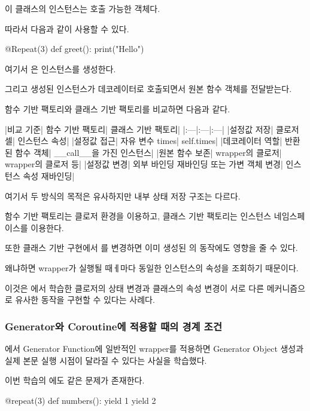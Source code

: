 이 클래스의 인스턴스는 호출 가능한 객체다.

따라서 다음과 같이 사용할 수 있다.

\begin{dhkcode}
@Repeat(3)
def greet():
    print("Hello")
\end{dhkcode}

여기서 은  인스턴스를 생성한다.

그리고 생성된 인스턴스가 데코레이터로 호출되면서 원본 함수 객체를 전달받는다.

함수 기반 팩토리와 클래스 기반 팩토리를 비교하면 다음과 같다.

\begin{dhktable}
|비교 기준|	함수 기반 팩토리|	클래스 기반 팩토리|
|:---|:---|:---|
|설정값 저장|	클로저 셀|	인스턴스 속성|
|설정값 접근|	자유 변수 times|	self.times|
|데코레이터 역할|	반환된 함수 객체|	__call__을 가진 인스턴스|
|원본 함수 보존|	wrapper의 클로저|	wrapper의 클로저 등|
|설정값 변경|	외부 바인딩 재바인딩 또는 가변 객체 변경|	인스턴스 속성 재바인딩|
\end{dhktable}

여기서 두 방식의 목적은 유사하지만 내부 상태 저장 구조는 다르다.

함수 기반 팩토리는 클로저 환경을 이용하고, 클래스 기반 팩토리는 인스턴스 네임스페이스를 이용한다.

또한 클래스 기반 구현에서 를 변경하면 이미 생성된 의 동작에도 영향을 줄 수 있다.

왜냐하면 wrapper가 실행될 때ㅔ마다 동일한 인스턴스의  속성을 조회하기 때문이다.

이것은 에서 학습한 클로저의 상태 변경과 클래스의 속성 변경이 서로 다른 메커니즘으로 유사한 동작을 구현할 수 있다는 사례다.

\subsubsection{Generator와 Coroutine에 적용할 때의 경계 조건}

에서 Generator Function에 일반적인 wrapper를 적용하면 Generator Object 생성과 실제 본문 실행 시점이 달라질 수 있다는 사실을 학습했다.

이번 학습의 에도 같은 문제가 존재한다.

\begin{dhkcode}
@repeat(3)
def numbers():
    yield 1
    yield 2
\end{dhkcode}

